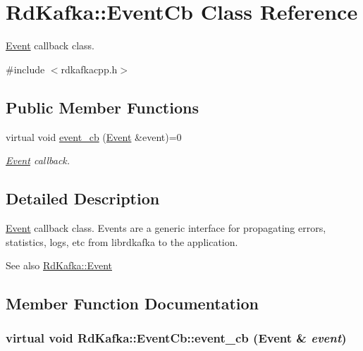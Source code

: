 \hypertarget{classRdKafka_1_1EventCb}{
\section{RdKafka::EventCb Class Reference}
\label{classRdKafka_1_1EventCb}
}


\hyperlink{classRdKafka_1_1Event}{Event} callback class.  


{\ttfamily \#include $<$rdkafkacpp.h$>$}\subsection*{Public Member Functions}
\begin{DoxyCompactItemize}
\item 
virtual void \hyperlink{classRdKafka_1_1EventCb_adc63c5b7747a12cc34f8b57819d17037}{event\_\-cb} (\hyperlink{classRdKafka_1_1Event}{Event} \&event)=0
\begin{DoxyCompactList}\small\item\em \hyperlink{classRdKafka_1_1Event}{Event} callback. \item\end{DoxyCompactList}\end{DoxyCompactItemize}


\subsection{Detailed Description}
\hyperlink{classRdKafka_1_1Event}{Event} callback class. Events are a generic interface for propagating errors, statistics, logs, etc from librdkafka to the application.

\begin{DoxySeeAlso}{See also}
\hyperlink{classRdKafka_1_1Event}{RdKafka::Event} 
\end{DoxySeeAlso}


\subsection{Member Function Documentation}
\hypertarget{classRdKafka_1_1EventCb_adc63c5b7747a12cc34f8b57819d17037}{
\subsubsection[{event\_\-cb}]{\setlength{\rightskip}{0pt plus 5cm}virtual void RdKafka::EventCb::event\_\-cb ({\bf Event} \& {\em event})}}
\label{classRdKafka_1_1EventCb_adc63c5b7747a12cc34f8b57819d17037}



